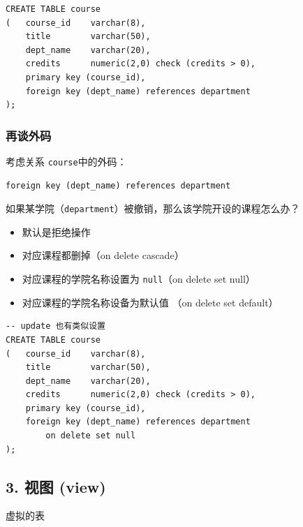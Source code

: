 \documentclass[aspectratio=169, 14pt]{beamer}
\begin{document}
\begin{frame}[fragile]

    \begin{verbatim}
CREATE TABLE course
(   course_id    varchar(8), 
    title        varchar(50), 
    dept_name    varchar(20),
    credits      numeric(2,0) check (credits > 0),
    primary key (course_id),
    foreign key (dept_name) references department
);
    \end{verbatim}

\end{frame}

\begin{frame}[fragile]
    \frametitle{再谈外码}

考虑关系 \texttt{course}中的外码：

\begin{verbatim}
foreign key (dept_name) references department 
\end{verbatim}

如果某学院（\texttt{department}）被撤销，那么该学院开设的课程怎么办？
\pause
\begin{itemize}
    \item 默认是拒绝操作
    \item 对应课程都删掉（\alert{on delete cascade}）
    \item 对应课程的学院名称设置为 \texttt{null}（\alert{on delete set null}）
    \item 对应课程的学院名称设备为默认值 （\alert{on delete set default}）    
\end{itemize}

\end{frame}

\begin{frame}[fragile]

    \begin{verbatim}
-- update 也有类似设置
CREATE TABLE course
(   course_id    varchar(8), 
    title        varchar(50), 
    dept_name    varchar(20),
    credits      numeric(2,0) check (credits > 0),
    primary key (course_id),
    foreign key (dept_name) references department
        on delete set null
);
    \end{verbatim}
\end{frame}

\begin{frame}
    \section{\textcolor{darkmidnightblue}{3. 视图 (view)}} 
    虚拟的表
\end{frame}
\end{document}
